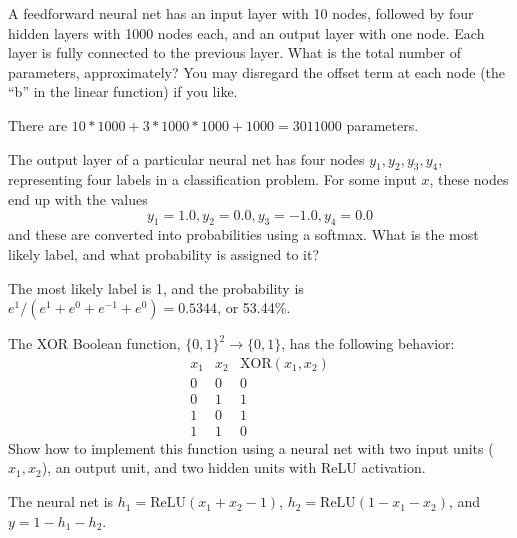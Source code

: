 \documentclass{article}
\begin{document}
\begin{probset}
\begin{prob}
    A feedforward neural net has an input layer with 10 nodes, followed by four hidden layers with 1000 nodes each, and an output layer with one node. Each layer is fully connected to the previous layer. What is the total number of parameters, approximately? You may disregard the offset term at each node (the ``b'' in the linear function) if you like.

    \begin{soln}
        There are $10 * 1000 + 3 * 1000 * 1000 + 1000 = 3011000$ parameters.
    \end{soln}
\end{prob}

\begin{prob}
    The output layer of a particular neural net has four nodes $y_1, y_2, y_3, y_4$, representing four labels in a classification problem. For some input $x$, these nodes end up with the values
    \[
        y_1 = 1.0, y_2 = 0.0, y_3 = -1.0, y_4 = 0.0
    \]
    and these are converted into probabilities using a softmax. What is the most likely label, and what probability is assigned to it?

    \begin{soln}
        The most likely label is 1, and the probability is $e^1 / (e^1 + e^0 + e^{-1} + e^0) = 0.5344$, or 53.44\%.
    \end{soln}
\end{prob}

\begin{prob}
    The XOR Boolean function, $\{0, 1\}^2 \rightarrow \{0, 1\}$, has the following behavior:
    \[
        \begin{array}{c|c|c}
            x_1 & x_2 & \text{XOR}(x_1, x_2) \\
            \hline
            0 & 0 & 0 \\
            0 & 1 & 1 \\
            1 & 0 & 1 \\
            1 & 1 & 0
        \end{array}
    \]
    Show how to implement this function using a neural net with two input units ($x_1, x_2$), an output unit, and two hidden units with ReLU activation.

    \begin{soln}
        The neural net is $h_1 = \text{ReLU}(x_1 + x_2 - 1)$, $h_2 = \text{ReLU}(1 - x_1 - x_2)$, and $y = 1 - h_1 - h_2$.
    \end{soln}
\end{prob}


\end{probset}
\end{document}
